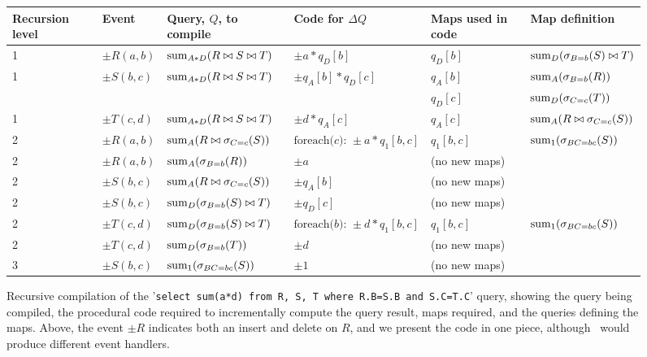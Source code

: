 \begin{figure*}[tb]
\begin{center}
\begin{tabular}{|l|l|l|l|l|l|}
\hline
Recursion level & Event & Query, $Q$, to compile & Code for $\Delta Q$
& Maps used in code & Map definition\\
\hline
1 & $\pm R(a,b)$ & $\mathrm{sum}_{A*D}(R \bowtie S \bowtie T)$
& $\pm a*q_D[b]$ & $q_D[b]$ & $\mathrm{sum}_{D}(\sigma_{B=b}(S) \bowtie T)$
\\
\hline
1 & $\pm S(b,c)$ & $\mathrm{sum}_{A*D}(R \bowtie S \bowtie T)$
& $\pm q_A[b] * q_D[c]$ & $q_A[b]$ & $\mathrm{sum}_{A}(\sigma_{B=b}(R))$
\\
& & & & $q_D[c]$ & $\mathrm{sum}_{D}(\sigma_{C=c}(T))$
\\
\hline
1 & $\pm T(c,d)$ & $\mathrm{sum}_{A*D}(R \bowtie S \bowtie T)$
& $\pm d*q_A[c]$ & $q_A[c]$ & $\mathrm{sum}_{A}(R \bowtie \sigma_{C=c}(S))$
\\
\hline
2 & $\pm R(a,b)$ & $\mathrm{sum}_{A}(R \bowtie \sigma_{C=c}(S))$
& $\mbox{foreach($c$): } \pm a * q_1[b,c]$ & $q_1[b,c]$ &
$\mathrm{sum}_{1}(\sigma_{BC=bc}(S))$
\\
2 & $\pm R(a,b)$ & $\mathrm{sum}_{A}(\sigma_{B=b}(R))$
& $\pm a$ & (no new maps) & \\
\hline
2 & $\pm S(b,c)$ & $\mathrm{sum}_{A}(R \bowtie \sigma_{C=c}(S))$
& $\pm q_A[b]$ & (no new maps) & 
\\
2 & $\pm S(b,c)$ & $\mathrm{sum}_{D}(\sigma_{B=b}(S) \bowtie T)$
& $\pm q_D[c] $ & (no new maps) & 
\\
\hline
2 & $\pm T(c,d)$ & $\mathrm{sum}_{D}(\sigma_{B=b}(S)\bowtie T)$
& $\mbox{foreach($b$): }\pm d * q_1[b,c]$ & $q_1[b,c]$ &
$\mathrm{sum}_{1}(\sigma_{BC=bc}(S))$
\\
2 & $\pm T(c,d)$ & $\mathrm{sum}_{D}(\sigma_{B=b}(T))$
& $\pm d$ & (no new maps) & \\
\hline
3 & $\pm S(b,c)$ & $\mathrm{sum}_{1}(\sigma_{BC=bc}(S))$
& $\pm 1$ & (no new maps) & \\
\hline
\end{tabular}
\end{center}

\vspace{-2mm}

\caption{Recursive compilation of the
'\texttt{select sum(a*d) from R, S, T where R.B=S.B and S.C=T.C}' query, showing the query being compiled,
the procedural code required to incrementally compute the query result, maps
required, and the queries defining the maps. Above, the event $\pm R$
indicates both an insert and delete on $R$, and we present the code
in one piece, although \compiler\ would produce different event handlers.}
\label{tab:derivation}

\vspace{-2mm}
\end{figure*}


